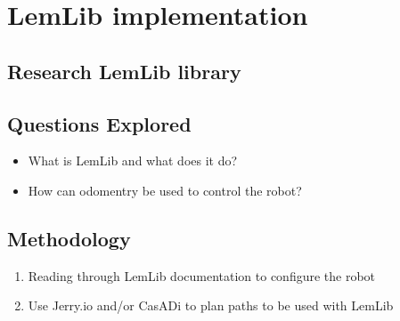 \section*{LemLib implementation}

\subsection*{Research LemLib library}

\subsection*{Questions Explored}
\begin{itemize}
    \item What is LemLib and what does it do?
    \item How can odomentry be used to control the robot?
\end{itemize}

\subsection*{Methodology}
\begin{enumerate}
    \item Reading through LemLib documentation to configure the robot
    \item Use Jerry.io and/or CasADi to plan paths to be used with LemLib
\end{enumerate}

